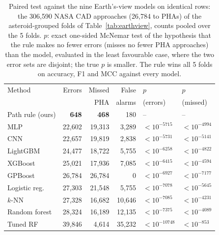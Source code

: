 \documentclass[make,article,submit,moreauthors]{Definitions/mdpi}
\begin{document}
\begin{table}[t]
\centering
\footnotesize
\caption{Paired test against the nine Earth's-view models on identical rows: the 306,590 NASA CAD approaches (26,784 to PHAs) of the asteroid-grouped folds of Table~\ref{tab:earthview}, counts pooled over the 5 folds. $p$: exact one-sided McNemar test of the hypothesis that the rule makes no fewer errors (misses no fewer PHA approaches) than the model, evaluated in the least favourable case, where the two error sets are disjoint; the true $p$ is smaller. The rule wins all 5 folds on accuracy, F1 and MCC against every model.}
\label{tab:sota}
\setlength{\tabcolsep}{3pt}
\begin{tabular}{@{}lrrrll@{}}
\toprule
Method & Errors & Missed & False & $p$ & $p$ \\
 & & PHA & alarms & (errors) & (missed) \\
\midrule
Path rule (ours) & \textbf{648} & \textbf{468} & 180 & -- & -- \\
\midrule
MLP & 22,602 & 19,313 & 3,289 & $<10^{-5715}$ & $<10^{-4994}$ \\
CNN & 22,657 & 19,819 & 2,838 & $<10^{-5731}$ & $<10^{-5141}$ \\
LightGBM & 24,477 & 18,722 & 5,755 & $<10^{-6258}$ & $<10^{-4822}$ \\
XGBoost & 25,021 & 17,936 & 7,085 & $<10^{-6415}$ & $<10^{-4594}$ \\
GPBoost & 26,784 & 26,784 & 0 & $<10^{-6927}$ & $<10^{-7177}$ \\
Logistic reg. & 27,303 & 21,548 & 5,755 & $<10^{-7078}$ & $<10^{-5645}$ \\
$k$-NN & 27,328 & 16,682 & 10,646 & $<10^{-7085}$ & $<10^{-4231}$ \\
Random forest & 28,324 & 16,189 & 12,135 & $<10^{-7375}$ & $<10^{-4089}$ \\
Tuned RF & 39,846 & 4,614 & 35,232 & $<10^{-10748}$ & $<10^{-853}$ \\
\bottomrule
\end{tabular}
\end{table}
\end{document}
